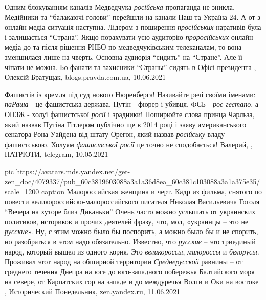 Одним блокуванням каналів Медведчука \emph{російська} пропаганда не зникла.
Медійники та \enquote{балакаючі голови} перейшли на канали Наш та Україна-24.
А от з онлайн-медіа ситуація наступна.  Лідером з поширення \emph{просійських}
наративів була і залишається \enquote{Страна}.  Якщо порахувати усю аудиторію
\emph{проросійських} онлайн-медіа до та після рішення РНБО по медведчуківським
телеканалам, то вона зменшилася лише на чверть.  Основна аудиорія
\enquote{сидить} на \enquote{Стране}. Але її чіпати не можна. Бо фанати та
захисники \enquote{Страны} сидять в Офісі президента
, 
Олексій Братущак, blogs.pravda.com.ua, 10.06.2021

Фашистів із кремля під суд нового Нюренберга!  Називайте речі своїми іменами:
\emph{паРаша} - це фашистська держава, Путін - фюрер і убивця, ФСБ - \emph{рос-гестапо}, а
ОПЗЖ - холуї фашистської \emph{росії} і зрадники!  Поширюйте слова принца Чарльза,
який назвав Путіна Гітлером публічно ще в 2014 році і заяву американського
сенатора Рона Уайдена від штату Орегон, який назвав \emph{російську} владу
фашистською. Холуям \emph{фашистської росії} це точно не сподобається!
Валерий, , ПАТРІОТИ, telegram, 10.05.2021

\ifcmt
  pic https://avatars.mds.yandex.net/get-zen_doc/4079337/pub_60c3819603088a3a1a36d8ea_60c381c103088a3a1a375e35/scale_1200
  caption Малороссийская женщина и черт. Кадр из фильма, снятого по повести великороссийско-малороссийского писателя Николая Васильевича Гоголя \enquote{Вечера на хуторе близ Диканьки}
\fi
Очень часто можно услышать от украинских политиков, историков и прочих деятелей
фразу, что, мол, «украинцы – это не \emph{русские}». Ну, с этим можно было бы
поспорить, а можно было бы и не спорить, но разобраться в этом надо
обязательно.  Известно, что \emph{русские} – это триединый народ, который вышел из
одного корня. Это \emph{великороссы}, \emph{малороссы} и \emph{белорусы}. Проживал этот народ на
обширной территории \emph{Среднерусской} равнины – от среднего течения Днепра на юге
до юго-западного побережья Балтийского моря на севере, от Карпатских гор на
западе и до междуречья Волги и Оки на востоке
, 
Исторический Понедельник, zen.yandex.ru, 11.06.2021

